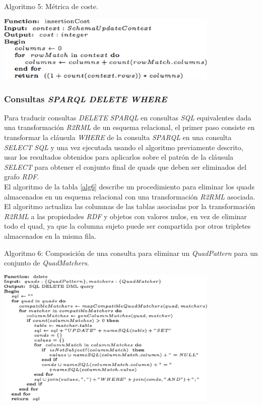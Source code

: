 \begin{table}
\vspace{2.4in}
\caption{Algoritmo 5: M\'etrica de coste.}
\includegraphics[width=0.8\textwidth]{algoritmo5}
\label{alg5}
\end{table}


\subsubsection{Consultas \textit{SPARQL} \textit{DELETE WHERE}}

Para traducir consultas \textit{DELETE} \textit{SPARQL} en consultas \textit{SQL} equivalentes dada una transformaci\'on \textit{R2RML} de un esquema relacional, el primer paso consiste en transformar la cl\'ausula \textit{WHERE} de la consulta \textit{SPARQL} en una consulta \textit{SELECT} \textit{SQL} y una vez ejecutada usando el algoritmo previamente descrito, usar los resultados obtenidos para aplicarlos sobre el patr\'on de la cl\'ausula \textit{SELECT} para obtener el conjunto final de quads que deben ser eliminados del grafo \textit{RDF}.\\
El algoritmo de la tabla \ref{alg6} describe un procedimiento para eliminar los quads almacenados en un esquema relacional con una transformaci\'on \textit{R2RML} asociada. El algoritmo actualiza las columnas de las tablas asociadas por la transformaci\'on \textit{R2RML} a las propiedades \textit{RDF} y objetos con valores nulos, en vez de eliminar todo el quad, ya que la columna sujeto puede ser compartida por otros tripletes almacenados en la misma fila.\\

\begin{table}
\vspace{2.4in}
\caption{Algoritmo 6: Composici\'on de una consulta para eliminar un \textit{QuadPattern} para un conjunto de \textit{QuadMatchers}.}
\includegraphics[width=0.8\textwidth]{algoritmo6}
\label{alg6}
\end{table}


